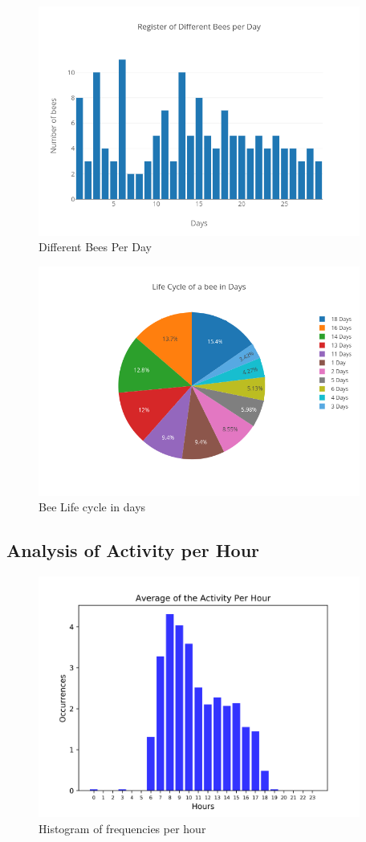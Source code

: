 \documentclass[11pt,fleqn]{book} %
\begin{document}
\begin{figure}[h!]%
\centering%
\includegraphics[width=400px]{Pictures/Morelia Hive 1differentBeesPerdayClean.png}%
\caption{Different Bees Per Day}%
\end{figure}

%


\begin{figure}[h!]%
\centering%
\includegraphics[width=400px]{Pictures/Morelia Hive 1pieBeeLifeCycleClean.png}%
\caption{Bee Life cycle in days}%
\end{figure}

%
\subsection{Analysis of Activity per Hour}%
\label{subsec:Analysis of Activity per Hour}%


\begin{figure}[h!]%
\centering%
\includegraphics[width=400px]{Pictures/Morelia Hive 1histogramClean.png}%
\caption{Histogram of frequencies per hour}%
\end{figure}
\end{document}
